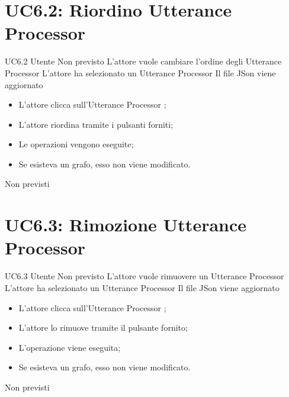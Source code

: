 \documentclass[../AnalisideiRequisiti.tex]{subfiles}
\begin{document}
\section{UC6.2: Riordino Utterance Processor}
\UserCase
{UC6.2}
{Utente}
{Non previsto}
{L'attore vuole cambiare l'ordine degli Utterance Processor}
{L'attore ha selezionato un Utterance Processor }
{Il file JSon viene aggiornato}
{
	\begin{itemize}
		\item{} L'attore clicca sull'Utterance Processor ;
		\item{} L'attore riordina tramite i pulsanti forniti;
		\item{} Le operazioni vengono eseguite;
		\item{} Se esisteva un grafo, esso non viene modificato.
		
	\end{itemize}
}
{Non previsti}

\section{UC6.3: Rimozione Utterance Processor}
\UserCase
{UC6.3}
{Utente}
{Non previsto}
{L'attore vuole rimuovere un Utterance Processor}
{L'attore ha selezionato un Utterance Processor }
{Il file JSon viene aggiornato}
{
	\begin{itemize}
		\item{} L'attore clicca sull'Utterance Processor ;
		\item{} L'attore lo rimuove tramite il pulsante fornito;
		\item{} L'operazione viene eseguita;
		\item{} Se esisteva un grafo, esso non viene modificato.
		
	\end{itemize}
}
{Non previsti}
\end{document}
